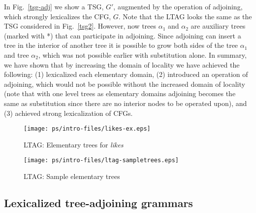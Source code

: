 In Fig.~\ref{tsg-adj} we show a TSG, $G'$, augmented by the operation
of adjoining, which strongly lexicalizes the CFG, $G$. Note that the
LTAG looks the same as the TSG considered in Fig.~\ref{tsg2}. However,
now trees $\alpha_1$ and $\alpha_2$ are auxiliary trees (marked with
*) that can participate in adjoining. Since adjoining can insert a
tree in the interior of another tree it is possible to grow both sides
of the tree $\alpha_1$ and tree $\alpha_2$, which was not possible
earlier with substitution alone. In summary, we have shown that by
increasing the domain of locality we have achieved the following: (1)
lexicalized each elementary domain, (2) introduced an operation of
adjoining, which would not be possible without the increased domain of
locality (note that with one level trees as elementary domains
adjoining becomes the same as substitution since there are no interior
nodes to be operated upon), and (3) achieved strong lexicalization of
CFGs.


\begin{figure*}[ht] 
\begin{center}
\texttt{[image: ps/intro-files/likes-ex.eps]}
\caption{\label{trees-likes} LTAG: Elementary trees for {\it likes}}
\end{center}
\end{figure*}

\begin{figure*}[ht] 
\begin{center}
\texttt{[image: ps/intro-files/ltag-sampletrees.eps]}
\caption{\label{more-trees} LTAG: Sample elementary trees}
\end{center}
\end{figure*}

\subsection{Lexicalized tree-adjoining grammars}

